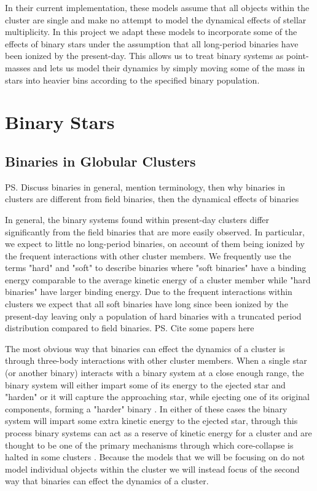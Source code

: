 In their current implementation, these models assume that all objects within the cluster are single
and make no attempt to model the dynamical effects of stellar multiplicity. In this project we adapt
these models to incorporate some of the effects of binary stars under the assumption that all
long-period binaries have been ionized by the present-day. This allows us to treat binary systems as
point-masses and lets us model their dynamics by simply moving some of the mass in stars into
heavier bins according to the specified binary population.



\section{Binary Stars}
\subsection{Binaries in Globular Clusters}

\ps{Discuss binaries in general, mention terminology, then why binaries in clusters are different
	from field binaries, then the dynamical effects of binaries}

In general, the binary systems found within present-day clusters differ significantly from the field
binaries that are more easily observed. In particular, we expect to little no long-period binaries,
on account of them being ionized by the frequent interactions with other cluster members. We
frequently use the terms "hard" and "soft" to describe binaries where "soft binaries" have a binding
energy comparable to the average kinetic energy of a cluster member while "hard binaries" have
larger binding energy. Due to the frequent interactions within clusters we expect that all soft
binaries have long since been ionized by the present-day leaving only a population of hard binaries
with a truncated period distribution compared to field binaries.
\ps{Cite some papers here}






The most obvious way that binaries can effect the dynamics of a cluster is through three-body
interactions with other cluster members. When a single star (or another binary) interacts with a
binary system at a close enough range, the binary system will either impart some of its energy to
the ejected star and "harden" or it will capture the approaching star, while ejecting one of its
original components, forming a "harder" binary \citep{Heggie2003}. In either of these cases the
binary system will impart some extra kinetic energy to the ejected star, through this process binary
systems can act as a reserve of kinetic energy for a cluster and are thought to be one of the
primary mechanisms through which core-collapse is halted in some clusters \citep{Chatterjee2013}.
Because the models that we will be focusing on do not model individual objects within the cluster we
will instead focus of the second way that binaries can effect the dynamics of a cluster.

